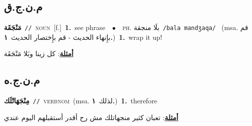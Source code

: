 \documentclass[10pt,a4paper,twoside]{article} %
\begin{document}
\begin{multicols}{2}
\vspace{-3mm}
\subsection*{\color{blue}\foreignlanguage{arabic}{م.ن.ج.ق}\color{blue}{}} 

{\setlength\topsep{0pt}\textbf{\foreignlanguage{arabic}{مَنْجَقَة}}\ {\color{gray}\texttt{//}\color{black}}\ \textsc{noun}\ [f.]\ \textbf{1.}~see phrase\ \ $\bullet$\ \ \textsc{ph.} \color{gray} \foreignlanguage{arabic}{بلَا منجقة}\color{black}\ {\color{gray}\texttt{/{\sffamily bala mandʒaqa}/}\color{black}}\ \color{gray} (msa. \foreignlanguage{arabic}{قم بإِنهاء الحديث - قم بإِختصار الحديث}~\foreignlanguage{arabic}{\textbf{١.}})\color{black}\ \textbf{1.}~wrap it up!\  \begin{flushright}\color{gray}\foreignlanguage{arabic}{\textbf{\underline{\foreignlanguage{arabic}{أمثلة}}}: كل زينا وبَلا مَنْجَقَة}\end{flushright}\color{black}} \vspace{2mm}

\vspace{-3mm}
\subsection*{\color{blue}\foreignlanguage{arabic}{م.ن.ج.ه}\color{blue}{ (ntws)}} 

{\setlength\topsep{0pt}\textbf{\foreignlanguage{arabic}{مِنْجَهَاتْلَك}}\ {\color{gray}\texttt{//}\color{black}}\ \textsc{verb\textunderscore nom}\ \color{gray}(msa. \foreignlanguage{arabic}{لذلك}~\foreignlanguage{arabic}{\textbf{١.}})\color{black}\ \textbf{1.}~therefore\  \begin{flushright}\color{gray}\foreignlanguage{arabic}{\textbf{\underline{\foreignlanguage{arabic}{أمثلة}}}: تعبان كثير منجهاتلك مش رح أقدر أستقبلهم اليوم عندي}\end{flushright}\color{black}} \vspace{2mm}


\end{multicols}
\end{document}

